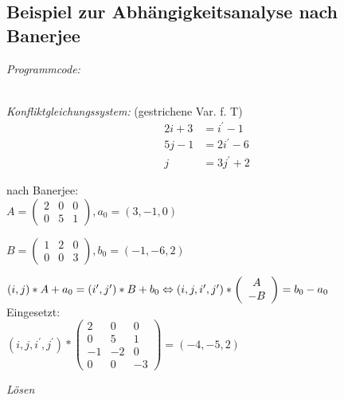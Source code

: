 \subsection{Beispiel zur Abhängigkeitsanalyse nach Banerjee}
\textit{Programmcode:}\\

\begin{procedure}
\SetAlgoLined
{}
\end{procedure}
~\\
\textit{Konfliktgleichungssystem:} (gestrichene Var. f. T)\\

\begin{align*}
2i+3 &= i^\prime  - 1\\
5j-1 &= 2i^\prime - 6\\
 j   &= 3j^\prime + 2
\end{align*}

nach Banerjee:\\

$A=
\left(
\begin{array}{ccc}
2 & 0 & 0\\
0 & 5 & 1
\end{array}
\right), a_0 = (3,-1,0)$

$B=
\left(
\begin{array}{ccc}
1 & 2 & 0\\
0 & 0 & 3
\end{array}
\right), b_0 = (-1, -6, 2)$


$(i,j) * A + a_0 = (i^\prime, j^\prime) * B + b_0 \\
\Leftrightarrow
(i,j,i^\prime,j^\prime) *
\left(
\begin{array}{c}
A\\
-B
\end{array}
\right)
= b_0 - a_0$\\
Eingesetzt:\\
$(i,j,i^\prime,j^\prime) *
\left(
\begin{array}{ccc}
2 & 0 & 0\\
0 & 5 & 1\\
-1&-2 & 0\\
0 & 0 &-3
\end{array}
\right)
= (-4,-5,2)$

\textit{Lösen}


